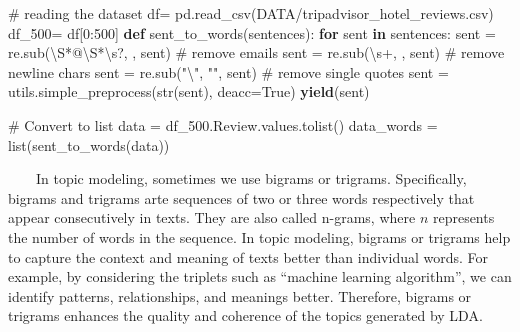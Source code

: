 \documentclass[
  letterpaper,
  DIV=11,
  numbers=noendperiod]{scrreprt}
\newenvironment{Shaded}{\begin{snugshade}}{\end{snugshade}}
\newcommand{\BuiltInTok}[1]{\textcolor[rgb]{0.00,0.23,0.31}{#1}}
\newcommand{\CharTok}[1]{\textcolor[rgb]{0.13,0.47,0.30}{#1}}
\newcommand{\CommentTok}[1]{\textcolor[rgb]{0.37,0.37,0.37}{#1}}
\newcommand{\ControlFlowTok}[1]{\textcolor[rgb]{0.00,0.23,0.31}{\textbf{#1}}}
\newcommand{\DecValTok}[1]{\textcolor[rgb]{0.68,0.00,0.00}{#1}}
\newcommand{\ErrorTok}[1]{\textcolor[rgb]{0.68,0.00,0.00}{#1}}
\newcommand{\KeywordTok}[1]{\textcolor[rgb]{0.00,0.23,0.31}{\textbf{#1}}}
\newcommand{\NormalTok}[1]{\textcolor[rgb]{0.00,0.23,0.31}{#1}}
\newcommand{\OperatorTok}[1]{\textcolor[rgb]{0.37,0.37,0.37}{#1}}
\newcommand{\StringTok}[1]{\textcolor[rgb]{0.13,0.47,0.30}{#1}}
\newcommand{\VariableTok}[1]{\textcolor[rgb]{0.07,0.07,0.07}{#1}}
\begin{document}
\begin{Shaded}
\begin{Highlighting}[]
\CommentTok{\# reading the dataset}
\NormalTok{df}\OperatorTok{=}\NormalTok{ pd.read\_csv(}\StringTok{\textquotesingle{}DATA/tripadvisor\_hotel\_reviews.csv\textquotesingle{}}\NormalTok{)}
\NormalTok{df\_500}\OperatorTok{=}\NormalTok{ df[}\DecValTok{0}\NormalTok{:}\DecValTok{500}\NormalTok{]}
\KeywordTok{def}\NormalTok{ sent\_to\_words(sentences):}
    \ControlFlowTok{for}\NormalTok{ sent }\KeywordTok{in}\NormalTok{ sentences:}
\NormalTok{        sent }\OperatorTok{=}\NormalTok{ re.sub(}\StringTok{\textquotesingle{}}\ErrorTok{\textbackslash{}}\StringTok{S*@}\ErrorTok{\textbackslash{}}\StringTok{S*}\ErrorTok{\textbackslash{}}\StringTok{s?\textquotesingle{}}\NormalTok{, }\StringTok{\textquotesingle{}\textquotesingle{}}\NormalTok{, sent)  }\CommentTok{\# remove emails}
\NormalTok{        sent }\OperatorTok{=}\NormalTok{ re.sub(}\StringTok{\textquotesingle{}}\ErrorTok{\textbackslash{}}\StringTok{s+\textquotesingle{}}\NormalTok{, }\StringTok{\textquotesingle{} \textquotesingle{}}\NormalTok{, sent)  }\CommentTok{\# remove newline chars}
\NormalTok{        sent }\OperatorTok{=}\NormalTok{ re.sub(}\StringTok{"}\CharTok{\textbackslash{}\textquotesingle{}}\StringTok{"}\NormalTok{, }\StringTok{""}\NormalTok{, sent)  }\CommentTok{\# remove single quotes}
\NormalTok{        sent }\OperatorTok{=}\NormalTok{ utils.simple\_preprocess(}\BuiltInTok{str}\NormalTok{(sent), deacc}\OperatorTok{=}\VariableTok{True}\NormalTok{) }
        \ControlFlowTok{yield}\NormalTok{(sent)  }

\CommentTok{\# Convert to list}
\NormalTok{data }\OperatorTok{=}\NormalTok{ df\_500.Review.values.tolist()}
\NormalTok{data\_words }\OperatorTok{=} \BuiltInTok{list}\NormalTok{(sent\_to\_words(data))}
\end{Highlighting}
\end{Shaded}

~~~~In topic modeling, sometimes we use bigrams or trigrams.
Specifically, bigrams and trigrams arte sequences of two or three words
respectively that appear consecutively in texts. They are also called
n-grams, where \(n\) represents the number of words in the sequence. In
topic modeling, bigrams or trigrams help to capture the context and
meaning of texts better than individual words. For example, by
considering the triplets such as ``machine learning algorithm'', we can
identify patterns, relationships, and meanings better. Therefore,
bigrams or trigrams enhances the quality and coherence of the topics
generated by LDA.
\end{document}
